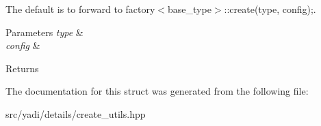The default is to forward to factory$<$base\+\_\+type$>$\+::create(type, config);. 


\begin{DoxyParams}{Parameters}
{\em type} & \\
\hline
{\em config} & \\
\hline
\end{DoxyParams}
\begin{DoxyReturn}{Returns}

\end{DoxyReturn}


The documentation for this struct was generated from the following file\+:\begin{DoxyCompactItemize}
\item 
src/yadi/details/create\+\_\+utils.\+hpp\end{DoxyCompactItemize}
